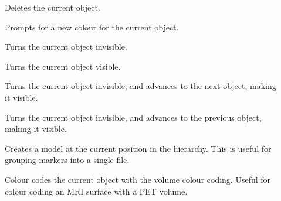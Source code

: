 \begin{description}
\item[]  Deletes the current
        object.
\item[]  Prompts for a new colour for the
        current object.
\item[]  Turns the current object invisible.
\item[]  Turns the current object visible.
\item[]  Turns the current object invisible,
               and advances to the next object, making it visible.
\item[]  Turns the current object invisible,
               and advances to the previous object, making it visible.
\item[]  Creates a model at the current
               position in the hierarchy.  This is useful for grouping
               markers into a single file.
\item[]  Colour codes the current object
               with the volume colour coding.  Useful for colour coding an
               MRI surface with a PET volume.
\end{description}



